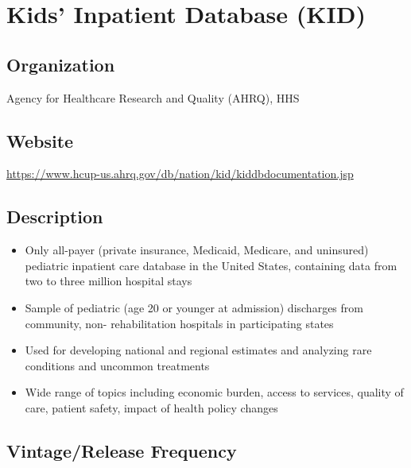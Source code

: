 \documentclass[
]{book}
\providecommand{\tightlist}{%
  \setlength{\itemsep}{0pt}\setlength{\parskip}{0pt}}
\begin{document}
\mainmatter

\hypertarget{kids-inpatient-database-kid}{%
\chapter{Kids' Inpatient Database (KID)}\label{kids-inpatient-database-kid}}

\hypertarget{organization-36}{%
\section{Organization}\label{organization-36}}

Agency for Healthcare Research and Quality (AHRQ), HHS

\hypertarget{website-36}{%
\section{Website}\label{website-36}}

\url{https://www.hcup-us.ahrq.gov/db/nation/kid/kiddbdocumentation.jsp}

\hypertarget{description-36}{%
\section{Description}\label{description-36}}

\begin{itemize}
\tightlist
\item
  Only all-payer (private insurance, Medicaid, Medicare, and uninsured) pediatric inpatient care database in the United States, containing data from two to three million hospital stays
\item
  Sample of pediatric (age 20 or younger at admission) discharges from community, non- rehabilitation hospitals in participating states
\item
  Used for developing national and regional estimates and analyzing rare conditions and uncommon treatments
\item
  Wide range of topics including economic burden, access to services, quality of care, patient safety, impact of health policy changes
\end{itemize}

\hypertarget{vintagerelease-frequency-36}{%
\section{Vintage/Release Frequency}\label{vintagerelease-frequency-36}}
\end{document}

